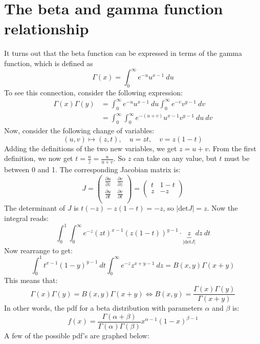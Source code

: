 \documentclass[12pt, a4paper]{article}
\begin{document}
\section{The beta and gamma function relationship}
It turns out that the beta function can be expressed in terms of the gamma function, which is defined as
\begin{equation}
\label{gamma}
\Gamma(x)=\int_0^\infty e^{-u}u^{x-1}\ du
\end{equation}
To see this connection, consider the following expression:
\begin{align}
\Gamma(x)\Gamma(y)&=\int_0^\infty e^{-u}u^{x-1}\ du\int_0^\infty e^{-v}v^{y-1}\ dv\\
&=\int_0^\infty\int_0^\infty e^{-(u+v)}u^{x-1}v^{y-1}\ du\ dv
\end{align}
Now, consider the following change of variables:
\begin{equation}
(u,v)\mapsto(z,t),\quad u=zt,\quad v=z(1-t)
\end{equation}
Adding the definitions of the two new variables, we get $z=u+v$. From the first definition, we now get $t=\frac{u}{z}=\frac{u}{u+v}$. So $z$ can take on any value, but $t$ must be between 0 and 1. The corresponding Jacobian matrix is:
\begin{equation}
J=\begin{pmatrix}
\frac{\partial u}{\partial z}	& \frac{\partial v}{\partial z} \\
\frac{\partial u}{\partial t}	& \frac{\partial v}{\partial t} \\
\end{pmatrix}
=\begin{pmatrix}
t	& 1-t \\
z	& -z \\
\end{pmatrix}
\end{equation}
The determinant of $J$ is $t(-z)-z(1-t)=-z$, so $|\textrm{det}J|=z$. Now the integral reads:
\begin{equation}
\int_0^1\int_0^\infty e^{-z}(zt)^{x-1}(z(1-t))^{y-1}\cdot\underbrace{z}_{|\textrm{det}J|} dz\ dt
\end{equation}
Now rearrange to get:
\begin{equation}
\int_0^1 t^{x-1}(1-y)^{y-1}\ dt\int_0^\infty e^{-z}z^{x+y-1}\ dz=B(x,y)\Gamma(x+y)
\end{equation}
This means that:
\begin{equation}
\Gamma(x)\Gamma(y)=B(x,y)\Gamma(x+y)\Leftrightarrow B(x,y)=\frac{\Gamma(x)\Gamma(y)}{\Gamma(x+y)}
\end{equation}
In other words, the pdf for a beta distribution with parameters $\alpha$ and $\beta$ is:
\begin{equation}
\label{pdf3}
f(x)=\frac{\Gamma(\alpha+\beta)}{\Gamma(\alpha)\Gamma(\beta)} x^{\alpha-1}(1-x)^{\beta-1}
\end{equation}
A few of the possible pdf's are graphed below:
\end{document}
